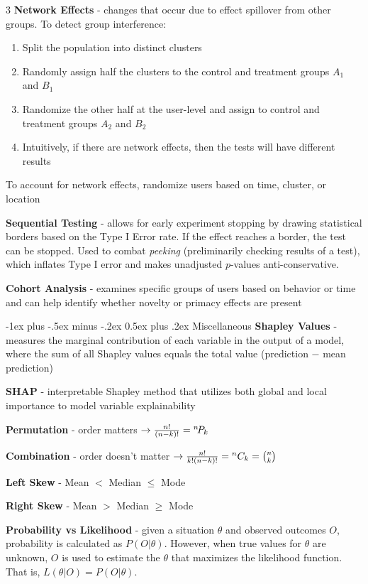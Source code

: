 \documentclass[10pt,landscape]{article}
\makeatletter
\renewcommand{\section}{\@startsection{section}{1}{0mm}%
                                {-1ex plus -.5ex minus -.2ex}%
                                {0.5ex plus .2ex}%
                                {\normalfont\large\bfseries}}
\makeatother
\begin{document}
\begin{multicols}{3}
        \textbf{Network Effects} - changes that occur due to effect spillover from other groups. To detect group interference:
        \begin{enumerate}[leftmargin=5mm]
            \itemsep -.4mm
            \item Split the population into distinct clusters
            \item Randomly assign half the clusters to the control and treatment groups $A_1$ and $B_1$
            \item Randomize the other half at the user-level and assign to control and treatment groups
                  $A_2$ and $B_2$
            \item Intuitively, if there are network effects, then the tests will have different results
        \end{enumerate}
        To account for network effects, randomize users based on time, cluster, or location
        \smallskip

        \textbf{Sequential Testing} - allows for early experiment stopping by drawing statistical borders based on the Type I Error rate. If the effect reaches a border, the test can be stopped. Used to combat \emph{peeking} (preliminarily checking results of a test), which inflates Type I error and makes unadjusted $p$-values anti-conservative.

        \textbf{Cohort Analysis} - examines specific groups of users based on behavior or time and can help identify whether novelty or primacy effects are present

        \section{Miscellaneous}
        \textbf{Shapley Values} - measures the marginal contribution of each variable in the output of a model, where the sum of all Shapley values equals the total value (prediction $-$ mean prediction)

        \textbf{SHAP} - interpretable Shapley method that utilizes both global and local importance to model variable explainability

        \textbf{Permutation} - order matters  $\to \frac{n!}{(n-k)!} = {}^{n}\!P_{k}$

        \textbf{Combination} - order doesn't matter $\to \frac{n!}{k!(n-k)!}= {}^{n}C_{k}= \binom nk$

        \textbf{Left Skew} - Mean $<$ Median $\leq$ Mode

        \textbf{Right Skew} - Mean $>$ Median $\geq$ Mode

        \textbf{Probability vs Likelihood} - given a situation $\theta$ and observed outcomes $O$, probability is calculated as $P(O|\theta)$. However, when true values for $\theta$ are unknown, $O$ is used to estimate the $\theta$ that maximizes the likelihood function. That is, $L(\theta|O) = P(O|\theta)$.
    \newpage
\end{multicols}
\end{document}
